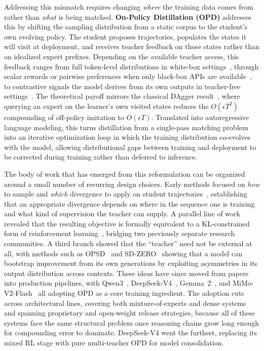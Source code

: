 \documentclass{article} %
\begin{document}
Addressing this mismatch requires changing \emph{where} the training data comes from rather than \emph{what} is being matched. \textbf{On-Policy Distillation (OPD)} addresses this by shifting the sampling distribution from a static corpus to the student's own evolving policy. The student proposes trajectories, populates the states it will visit at deployment, and receives teacher feedback on those states rather than on idealized expert prefixes. Depending on the available teacher access, this feedback ranges from full token-level distributions in white-box settings~\citep{2306.13649,2306.08543}, through scalar rewards or pairwise preferences when only black-box APIs are available~\citep{2511.10643,2305.12870}, to contrastive signals the model derives from its own outputs in teacher-free settings~\citep{2601.18734}. The theoretical payoff mirrors the classical DAgger result~\citep{1011.0686}, where querying an expert on the learner's own visited states reduces the $O(\epsilon T^2)$ compounding of off-policy imitation to $O(\epsilon T)$. Translated into autoregressive language modeling, this turns distillation from a single-pass matching problem into an iterative optimization loop in which the training distribution co-evolves with the model, allowing distributional gaps between training and deployment to be corrected during training rather than deferred to inference.

The body of work that has emerged from this reformulation can be organized around a small number of recurring design choices. Early methods focused on \emph{how} to sample and \emph{which} divergence to apply on student trajectories~\citep{2306.13649,2306.08543,2402.03898}, establishing that an appropriate divergence depends on where in the sequence one is training and what kind of supervision the teacher can supply. A parallel line of work revealed that the resulting objective is formally equivalent to a KL-constrained form of reinforcement learning~\citep{2602.12125}, bridging two previously separate research communities. A third branch showed that the ``teacher'' need not be external at all, with methods such as OPSD~\citep{2601.18734} and SD-ZERO~\citep{2604.12002} showing that a model can bootstrap improvement from its own generations by exploiting asymmetries in its output distribution across contexts. These ideas have since moved from papers into production pipelines, with Qwen3~\citep{2505.09388}, DeepSeek-V4~\citep{deepseekv4}, Gemma~2~\citep{2408.00118}, and MiMo-V2-Flash~\citep{2601.02780} all adopting OPD as a core training ingredient. The adoption cuts across architectural lines, covering both mixture-of-experts and dense systems and spanning proprietary and open-weight release strategies, because all of these systems face the same structural problem once reasoning chains grow long enough for compounding error to dominate. DeepSeek-V4 went the furthest, replacing its mixed RL stage with pure multi-teacher OPD for model consolidation.
\end{document}
